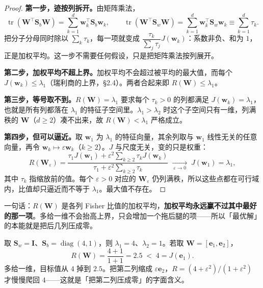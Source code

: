 \documentclass[11pt,a4paper,fontset=windows,zihao=-4]{ctexart}
\newcommand{\bw}{\mathbf{w}}
\newcommand{\be}{\mathbf{e}}
\newcommand{\bS}{\mathbf{S}}
\newcommand{\bI}{\mathbf{I}}
\newcommand{\bW}{\mathbf{W}}
\newcommand{\tp}{^{\top}}
\DeclareMathOperator{\tr}{tr}
\DeclareMathOperator{\diag}{diag}
\begin{document}
\begin{proof}
\textbf{第一步，迹按列拆开。}由矩阵乘法，
\begin{equation}
  \tr(\bW\tp\bS_b\bW)=\sum_{k=1}^{d}\bw_k\tp\bS_b\bw_k,
  \qquad
  \tr(\bW\tp\bS_w\bW)=\sum_{k=1}^{d}\bw_k\tp\bS_w\bw_k\equiv\sum_{k=1}^{d}\tau_k .
\end{equation}
把分子分母同时除以 $\sum_k\tau_k$，每一项就变成 $\dfrac{\tau_k}{\sum_j\tau_j}J(\bw_k)$：系数非负、和为 $1$，正是加权平均。这一步不需要任何假设，只是把矩阵乘法按列展开。

\textbf{第二步，加权平均不超上界。}加权平均不会超过被平均的最大值，而每个 $J(\bw_k)\le\lambda_1$（瑞利商的上界，\S2.4）。两者合起来即 $R(\bW)\le\lambda_1$。

\textbf{第三步，等号取不到。}$R(\bW)=\lambda_1$ 要求每个 $\tau_k>0$ 的列都满足 $J(\bw_k)=\lambda_1$，也就是所有列都落在 $\lambda_1$ 的特征子空间里。$\lambda_1>\lambda_2$ 时这个子空间只有一维，列满秩的 $\bW$（$d\ge2$）凑不出来，故 $R(\bW)<\lambda_1$ 严格成立。

\textbf{第四步，但可以逼近。}取 $\bw_1$ 为 $\lambda_1$ 的特征向量，其余列取与 $\bw_1$ 线性无关的任意向量，再令 $\bw_k\mapsto\varepsilon\bw_k$（$k\ge2$）。$J$ 与尺度无关，变的只是权重：
\begin{equation}
  R(\bW_\varepsilon)
  =\frac{\tau_1J(\bw_1)+\varepsilon^2\sum_{k\ge2}\tau_kJ(\bw_k)}
        {\tau_1+\varepsilon^2\sum_{k\ge2}\tau_k}
  \;\xrightarrow[\ \varepsilon\to0\ ]{}\;J(\bw_1)=\lambda_1 ,
\end{equation}
其中 $\tau_k$ 指缩放前的值。每个 $\varepsilon>0$ 对应的 $\bW_\varepsilon$ 仍列满秩，所以这些点都在可行域内，比值却只逼近而不等于 $\lambda_1$。最大值不存在。
\end{proof}

一句话：$R(\bW)$ 是各列 Fisher 比值的加权平均，\textbf{加权平均永远赢不过其中最好的那一项}。多给一维不会抬高上界，只会增加一个拖后腿的项——所以「最优解」的本能就是把后几列压成零。

\begin{add}
取 $\bS_w=\bI$、$\bS_b=\diag(4,1)$，则 $\lambda_1=4$、$\lambda_2=1$。若取 $\bW=[\be_1,\be_2]$，
\begin{equation}
  R(\bW)=\frac{4+1}{1+1}=2.5\;<\;4=J(\be_1).
\end{equation}
多给一维，目标值从 $4$ 掉到 $2.5$。把第二列缩成 $\varepsilon\be_2$，$R=(4+\varepsilon^2)/(1+\varepsilon^2)$ 才慢慢爬回 $4$——这就是「把第二列压成零」的字面含义。
\end{add}
\end{document}
